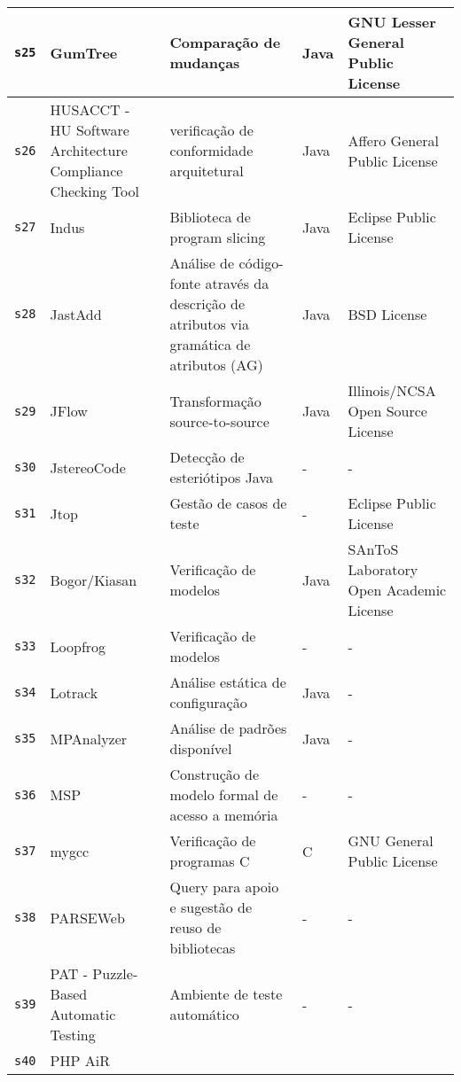 \begin{longtable}{| l | p{4.5cm} | p{7cm} | p{1.5cm} | p{3cm} |}
    \texttt{s25} &
      GumTree &
      Comparação de mudanças &
      Java &
      GNU Lesser General Public License \\
    \hline
    \texttt{s26} &
      HUSACCT - HU Software Architecture Compliance Checking Tool &
      verificação de conformidade arquitetural &
      Java &
      Affero General Public License \\
    \hline
    \texttt{s27} &
      Indus &
      Biblioteca de program slicing &
      Java &
      Eclipse Public License \\
    \hline
    \texttt{s28} &
      JastAdd &
      Análise de código-fonte através da descrição de atributos via gramática de atributos (AG) &
      Java &
      BSD License \\
    \hline
    \texttt{s29} &
      JFlow &
      Transformação source-to-source &
      Java &
      Illinois/NCSA Open Source License \\
    \hline
    \texttt{s30} &
      JstereoCode &
      Detecção de esteriótipos Java &
      - &
      - \\
    \hline
    \texttt{s31} &
      Jtop &
      Gestão de casos de teste &
      - &
      Eclipse Public License \\
    \hline
    \texttt{s32} &
      Bogor/Kiasan &
      Verificação de modelos &
      Java &
      SAnToS Laboratory Open Academic License \\
    \hline
    \texttt{s33} &
      Loopfrog &
      Verificação de modelos &
      - &
      - \\
    \hline
    \texttt{s34} &
      Lotrack &
      Análise estática de configuração &
      Java &
      - \\
    \hline
    \texttt{s35} &
      MPAnalyzer &
      Análise de padrões disponível &
      Java &
      - \\
    \hline
    \texttt{s36} &
      MSP &
      Construção de modelo formal de acesso a memória &
      - &
      - \\
    \hline
    \texttt{s37} &
      mygcc &
      Verificação de programas C &
      C &
      GNU General Public License \\
    \hline
    \texttt{s38} &
      PARSEWeb &
      Query para apoio e sugestão de reuso de bibliotecas &
      - &
      - \\
    \hline
    \texttt{s39} &
      PAT - Puzzle-Based Automatic Testing &
      Ambiente de teste automático &
      - &
      - \\
    \hline
    \texttt{s40} &
      PHP AiR &

\end{longtable}
